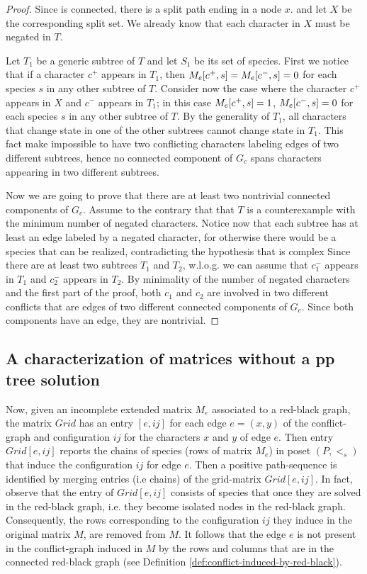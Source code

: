 \begin{proof} %
Since \grb is connected, there is a split path ending in a node $x$. and let
$X$ be the corresponding split set.
We already know that each character in
$X$ must be negated in $T$.

Let $T_{1}$ be a generic subtree of $T$ and let $S_{1}$ be its set of species.
First we notice that if a character $c^{+}$ appears in $T_{1}$, then
$M_{e}[c^{+},s]=M_{e}[c^{-},s]=0$ for each species $s$ in any other subtree of $T$.
Consider now the case where the character $c^{+}$ appears in $X$ and $c^{-}$
appears in $T_{1}$; in this case $M_{e}[c^{+},s]=1$, $M_{e}[c^{-},s]=0$ for each
species $s$ in any other subtree of $T$.
By the generality of $T_{1}$, all characters that change state in one of the
other subtrees cannot change state in $T_{1}$.
This fact make impossible to have two conflicting characters labeling edges of
two different subtrees, hence no connected component of $G_{c}$ spans characters
appearing in two different subtrees.

Now we are going to prove that there are at least two nontrivial connected
components of $G_{c}$.
Assume to the contrary that that $T$ is a counterexample with the minimum number
of negated characters.
Notice now that each subtree has at least an edge labeled by a negated
character, for otherwise there would be a species that can be realized,
contradicting the hypothesis that \grb is complex
Since there are at least two subtrees $T_{1}$ and $T_{2}$, w.l.o.g. we can
assume that $c_{1}^{-}$ appears in $T_{1}$ and $c_{2}^{-}$ appears in $T_{2}$.
By minimality of the number of negated characters and the first part of the
proof, both $c_{1}$ and $c_{2}$ are involved in two different conflicts that are
edges of two different connected components of $G_{c}$.
Since both components have an edge, they are nontrivial.
\end{proof}




\subsection{A characterization of matrices without a pp tree solution}


Now, given
an incomplete extended matrix $M_e$ associated to a red-black graph,  the
matrix $Grid$  has an entry $ [e, ij]$ for each edge $e= (x,y)$ of the
conflict-graph  and configuration $ij$  for the characters $x$ and $y$ of edge
$e$. Then entry $Grid[e, ij]$ reports the chains of species (rows of matrix
$M_e$)  in poset $(P,<_s)$ that induce the configuration $ij$ for edge $e$.
Then a \initial positive path-sequence is identified by merging entries (i.e
chains) of the grid-matrix $Grid[e, ij]$.  In fact, observe that  the  entry of
$Grid[e, ij]$ consists of  species that once they are solved in the red-black
graph, i.e. they become isolated nodes in the red-black graph. Consequently,
the rows corresponding to  the configuration $ij$
they induce in the original matrix $M$, are  removed from $M$. It follows that
the edge $e$ is not present in the  conflict-graph induced in $M$ by the rows
and columns
that are in the connected red-black graph (see Definition
\ref{def:conflict-induced-by-red-black}).


